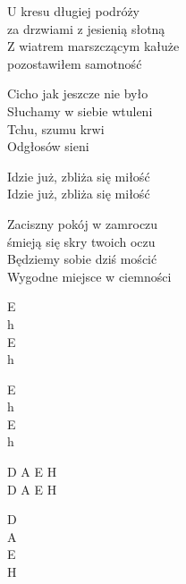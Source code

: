 \begin{text}
    U kresu długiej podróży\\
    za drzwiami z jesienią słotną\\
    Z wiatrem marszczącym kałuże\\
    pozostawiłem samotność

    Cicho jak jeszcze nie było\\
    Słuchamy w siebie wtuleni\\
    Tchu, szumu krwi\\
    Odgłosów sieni

    Idzie już, zbliża się miłość\\
    Idzie już, zbliża się miłość

    Zaciszny pokój w zamroczu\\
    śmieją się skry twoich oczu\\
    Będziemy sobie dziś mościć\\
    Wygodne miejsce w ciemności
\end{text}
\begin{chord}
    E\\
    h\\
    E\\
    h

    E\\
    h\\
    E\\
    h

    D A E H\\
    D A E H

    D\\
    A\\
    E\\
    H
\end{chord}